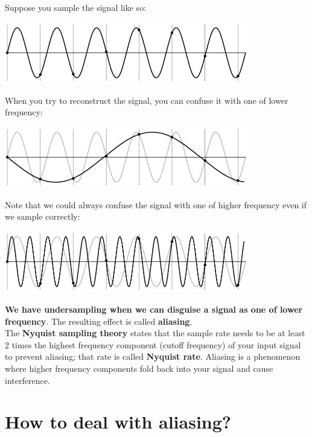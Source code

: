 \documentclass{article}
\begin{document}
Suppose you sample the signal like so:

\begin{center}
\includegraphics[width=0.8\textwidth]{images/undersampling.png}
\end{center}

When you try to reconstruct the signal, you can confuse it with one of lower frequency:

\begin{center}
\includegraphics[width=0.8\textwidth]{images/undersampling_lower_freq.png}
\end{center}

Note that we could always confuse the signal with one of higher frequency even if we sample correctly:

\begin{center}
\includegraphics[width=0.8\textwidth]{images/undersampling_higher_freq.png}
\end{center}

\newpage

\textbf{We have undersampling when we can disguise a signal as one of lower frequency}. The resulting effect is called \textbf{aliasing}. \\

The \textbf{Nyquist sampling theory} states that the sample rate needs to be at least 2 times the highest frequency component (cutoff frequency) of your input signal to prevent aliasing; that rate is called \textbf{Nyquist rate}. Aliasing is a phenomenon where higher frequency components fold back into your signal and cause interference.

\section*{How to deal with aliasing?}
\end{document}
